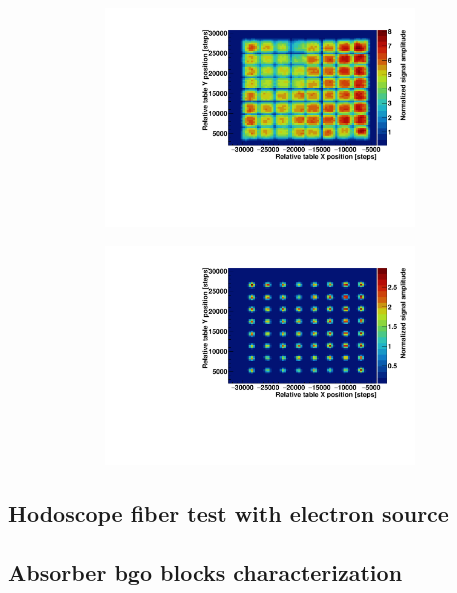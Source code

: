 \begin{figure}
\begin{subfigure}[t]{.5\textwidth}
\centering
\includegraphics[width=1\textwidth, height = 5.8cm ]{03_GraphicFiles/chapter3_CLaRySproto/Hodoscope/PMchar/2Dmap_noMask.pdf}
\caption{}
\label{chap3::fig::hodoPMchar2DnoMask}
\end{subfigure}
\begin{subfigure}[t]{.5\textwidth}
\centering
\includegraphics[width=1\textwidth, height = 5.8cm ]{03_GraphicFiles/chapter3_CLaRySproto/Hodoscope/PMchar/2Dmap_withMask.pdf}
\caption{}
\label{chap3::fig::hodoPMchar2DnoMask}
\end{subfigure}
\caption{}
\label{chap3::fig::hodoPMchar2Dmaps}
\end{figure}





\subsection{Hodoscope fiber test with electron source}\label{chap3::subsec::hodoBetatest}


\subsection{Absorber \gls{bgo} blocks characterization}\label{chap3::subsec::absBGOchar}

